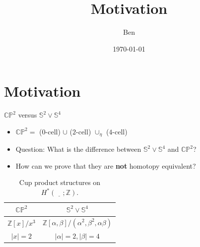\documentclass{beamer}
\title{Motivation}
\author{Ben}
\institute{University of Bonn}
\date{\today}
\newcommand{\sphere}[1]{\mathbb{S}^{#1}}
\newcommand{\CP}[1]{\mathbb{CP}^{#1}}
\newcommand{\Z}{\mathbb{Z}}
\begin{document}


\section{Motivation}

\begin{frame}{$\CP{2}$ versus $\sphere{2} \vee \sphere{4}$}
	
	\begin{itemize}
	  \item $\CP{2} = $ ($0$-cell) $\cup$ ($2$-cell) $\cup_{\eta}$ ($4$-cell)
	  
	  \pause
	  
	  \item Question: What is the difference between $\sphere{2} \vee \sphere{4}$
	  and $\CP{2}$?
	  \item How can we prove that they are \textbf{not} homotopy equivalent?
	\end{itemize}
	
	\pause

	\renewcommand{\arraystretch}{1.3}
	\begin{table}
		\centering
		\begin{tabular}{c|c}
			$\CP{2}$ 			& $\sphere{2} \vee \sphere{4}$ \\\hline
			$\Z[x]/x^{3}$ 		& $\Z[\alpha, \beta]/(\alpha^2, \beta^2, \alpha \beta)$ \\
			$|x| = 2$ 			& $|\alpha| = 2, |\beta| = 4$
		\end{tabular}
		\caption{\label{tab:cup_producs} Cup product structures on $H^{*}(\underline{\quad}; \Z)$.}
	\end{table}

\end{frame}
\end{document}
